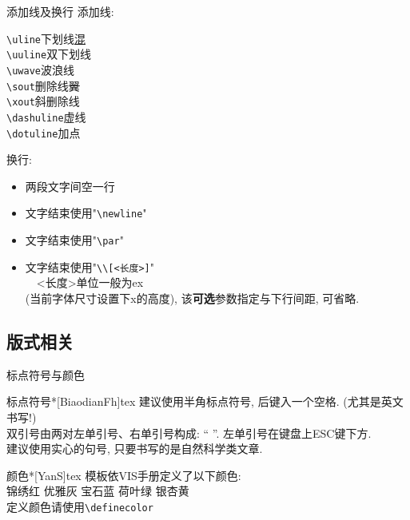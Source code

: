 \documentclass[hyperref, UTF8, CJK, aspectratio=169]{beamer}
\begin{document}
\begin{frame}[fragile]{添加线及换行}
	添加线:
	\begin{multicols}{2}
		\verb|\uline|\hfill 下划线\qquad\uline{混}\\
		\verb|\uuline|\hfill 双下划线\qquad{}\\
		\verb|\uwave|\hfill 波浪线\qquad{}\\
		\verb|\sout|\hfill 删除线\qquad\sout{翼}\\
		\verb|\xout|\hfill 斜删除线\qquad{}\\
		\verb|\dashuline|\hfill 虚线\qquad{}\\
		\verb|\dotuline|\hfill 加点\qquad{}
	\end{multicols}
	换行:
	\begin{multicols}{2}
		\begin{itemize}
			\item 两段文字间空一行
			\item 文字结束使用"\verb!\newline!"
			\item 文字结束使用"\verb!\par!"
			\item 文字结束使用"\verb!\\[<长度>]!"\\
			~~<长度>单位一般为ex\\(当前字体尺寸设置下x的高度), 该\textbf{可选}参数指定与下行间距, 可省略.
		\end{itemize}
	\end{multicols}
\end{frame}

\subsection{版式相关}
\begin{frame}[fragile]{标点符号与颜色}
	\scriptsize
	\begin{scucode}{标点符号}*[BiaodianFh]{tex}
		建议使用半角标点符号, 后键入一个空格. (尤其是英文书写!)\\[1ex]
		双引号由两对左单引号、右单引号构成: ``  ''. 左单引号在键盘上ESC键下方.\\[1ex]
		建议使用实心的句号, 只要书写的是自然科学类文章.
	\end{scucode}
	\begin{scucode}{颜色}*[YanS]{tex}
		模板依VIS手册定义了以下颜色:\\
		\textcolor{scured}{锦绣红}
		\textcolor{scugrey}{优雅灰}
		\textcolor{scublue}{宝石蓝}
		\textcolor{scugreen}{荷叶绿}
		\textcolor{scuyellow}{银杏黄}\\
		定义颜色请使用\verb!\definecolor!
	\end{scucode}
\end{frame}
	
\end{document}
